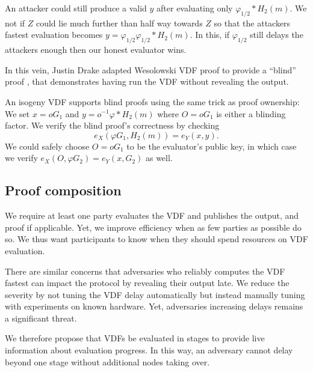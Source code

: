 \documentclass{article}
\newcommand\mathperiod{.}
\begin{document}
An attacker could still produce a valid $y$ after evaluating only
$φ_{1/2}* H_2(m)$.  We not  if $Z$ could lie much further than
half way towards $Z$ so that the attackers fastest evaluation
becomes $y = φ_{1/2} φ_{1/2}* H_2(m)$.  In this, if $φ_{1/2}$ 
still delays the attackers enough then our honest evaluator wins.

\smallskip

In this vein, Justin Drake adapted Wesolowski VDF proof to provide
a ``blind'' proof \cite{}, %
that demonstrates having run the VDF without revealing the output.

An isogeny VDF supports blind proofs using the same trick as proof
ownership:  We set $x = o G_1$ and $y = o^{-1} φ* H_2(m)$
where $O = o G_1$ is either a blinding factor.
We verify the blind proof's correctness by checking
$$ e_X( φ G_1, H_2(m) ) = e_Y( x, y ) \mathperiod $$ %
We could safely choose $O = o G_1$ to be the evaluator's public key,
in which case we verify $e_X(O, φ G_2) = e_Y(x, G_2)$ as well.


\subsection{Proof composition}

We require at least one party evaluates the VDF and publishes the output, and proof if applicable.  Yet, we improve efficiency when as few parties as possible do so.  We thus want participants to know when they should spend resources on VDF evaluation.

There are similar concerns that adversaries who reliably computes the VDF fastest can impact the protocol by revealing their output late.  We reduce the severity by not tuning the VDF delay automatically but instead manually tuning with experiments on known hardware.  Yet, adversaries increasing delays remains a significant threat.

We therefore propose that VDFs be evaluated in stages to provide live information about evaluation progress.  In this way, an adversary cannot delay beyond one stage without additional nodes taking over.  
\end{document}
